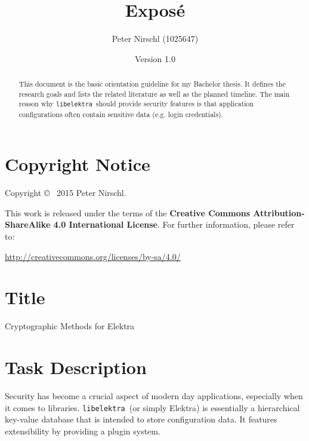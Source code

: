 \documentclass[a4paper,12pt]{article}
\title{Exposé}
\author{Peter Nirschl (1025647)}
\date{Version 1.0}
\newcommand{\libelektra}{\texttt{libelektra}~}
\begin{document}
\maketitle
\begin{abstract}
This document is the basic orientation guideline for my Bachelor thesis.
It defines the research goals and lists the related literature as well as the planned timeline.
The main reason why \libelektra should provide security features is that application configurations often contain sensitive data (e.g. login credentials).
\end{abstract}

\vfill

\section*{Copyright Notice}

Copyright \copyright~ 2015 Peter Nirschl.

This work is released under the terms of the \textbf{Creative Commons Attribution-ShareAlike 4.0 International License}.
For further information, please refer to:

\url{http://creativecommons.org/licenses/by-sa/4.0/}

\newpage

\section{Title}

Cryptographic Methods for Elektra


\section{Task Description}

Security has become a crucial aspect of modern day applications, especially when it comes to libraries.
\libelektra (or simply Elektra) is essentially a hierarchical key-value database that is intended to store configuration data.
It features extensibility by providing a plugin system.
\end{document}
